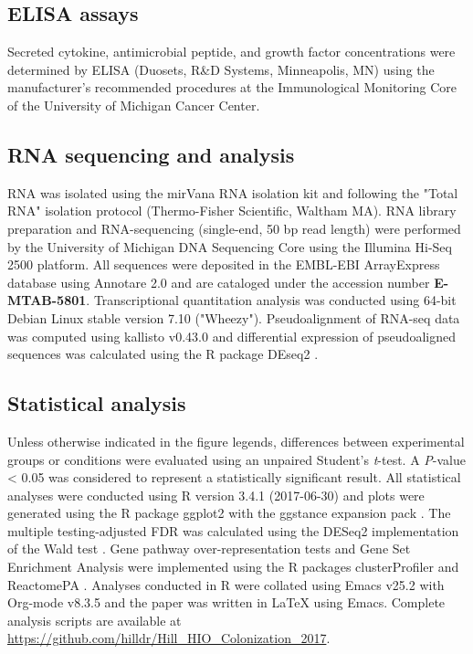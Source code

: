 \documentclass[9pt,lineo]{elife}
\begin{document}
\subsection*{{\bfseries\sffamily } ELISA assays}
\label{sec:orgheadline24}
Secreted cytokine, antimicrobial peptide, and growth factor concentrations were determined by ELISA (Duosets, R\&D Systems, Minneapolis, MN) using the manufacturer's recommended procedures at the Immunological Monitoring Core of the University of Michigan Cancer Center.
\subsection*{{\bfseries\sffamily } RNA sequencing and analysis}
\label{sec:orgheadline25}
RNA was isolated using the mirVana RNA isolation kit and following the "Total RNA" isolation protocol (Thermo-Fisher Scientific, Waltham MA). RNA library preparation and RNA-sequencing (single-end, 50 bp read length) were performed by the University of Michigan DNA Sequencing Core using the Illumina Hi-Seq 2500 platform. All sequences were deposited in the EMBL-EBI ArrayExpress database using Annotare 2.0 and are cataloged under the accession number \textbf{E-MTAB-5801}. Transcriptional quantitation analysis was conducted using 64-bit Debian Linux stable version 7.10 ("Wheezy"). Pseudoalignment of RNA-seq data was computed using kallisto v0.43.0 \citep{Bray:2016} and differential expression of pseudoaligned sequences was calculated using the R package DEseq2 \citep{Love:2014}. 
\subsection*{{\bfseries\sffamily } Statistical analysis}
\label{sec:orgheadline26}
Unless otherwise indicated in the figure legends, differences between experimental groups or conditions were evaluated using an unpaired Student's \emph{t}-test. A \emph{P}-value < 0.05 was considered to represent a statistically significant result. All statistical analyses were conducted using R version 3.4.1 (2017-06-30) \citep{CRAN:2017} and plots were generated using the R package ggplot2 \citep{Wickham:2009} with the ggstance expansion pack \cite{Henry:2016}. The multiple testing-adjusted FDR was calculated using the DESeq2 implementation of the Wald test \citep{Love:2014}. Gene pathway over-representation tests and Gene Set Enrichment Analysis \citep{Subramanian:2005} were implemented using the R packages clusterProfiler \citep{Yu:2012} and ReactomePA \citep{Yu:2016}. Analyses conducted in R were collated using Emacs v25.2 \citep{Stallman:1981:EEC:1159890.806466} with Org-mode v8.3.5 and the paper was written in \LaTeX{} using Emacs. Complete analysis scripts are available at \url{https://github.com/hilldr/Hill_HIO_Colonization_2017}.
\end{document}

